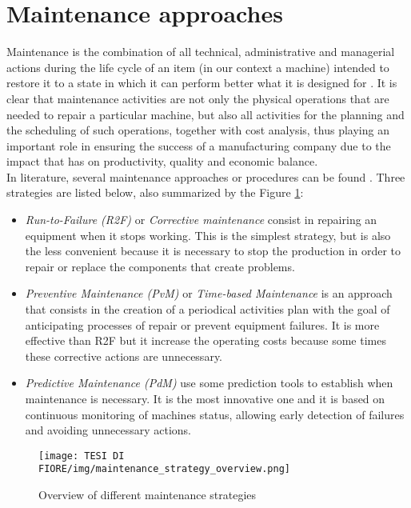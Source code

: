 \section{Maintenance approaches}
Maintenance is the combination of all technical, administrative and managerial actions during the life cycle of an item (in our context a machine) intended to restore it to a state in which it can perform better what it is designed for \cite{4maintenanceTransformation}. It is clear that maintenance activities are not only the physical operations that are needed to repair a particular machine, but also all activities for the planning and the scheduling of such operations, together with cost analysis, thus playing an important role in ensuring the success of a manufacturing company due to the impact that has on productivity, quality and economic balance.\\
In literature, several maintenance approaches or procedures can be found \cite{3SystematicLiteratureReviewML}. Three strategies are listed below, also summarized by the Figure \ref{maintenance_strategy_overview}:
\begin{itemize}
\item{\textit{Run-to-Failure (R2F)} or \textit{Corrective maintenance} consist in repairing an equipment when it stops working. This is the simplest strategy, but is also the less convenient because it is necessary to stop the production in order to repair or replace the components that create problems.}
\item{\textit{Preventive Maintenance (PvM)} or \textit{Time-based Maintenance} is an approach that consists in the creation of a periodical activities plan with the goal of anticipating processes of repair or prevent equipment failures. It is more effective than R2F but it increase the operating costs because some times these corrective actions are unnecessary.}
\item{\textit{Predictive Maintenance (PdM)} use some prediction tools to establish when maintenance is necessary. It is the most innovative one and it is based on continuous monitoring of machines status, allowing early detection of failures and avoiding unnecessary actions.}
\end{itemize}

\begin{figure}[ht]
\texttt{[image: TESI DI FIORE/img/maintenance\_strategy\_overview.png]}
\centering
\caption{Overview of different maintenance strategies \cite{3SystematicLiteratureReviewML}}
\label{maintenance_strategy_overview}
\end{figure}

